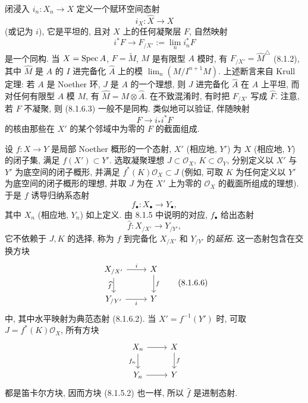 闭浸入 $i_n:X_n\to X$ 定义一个赋环空间态射
\begin{equation}i_X:\widehat X\longrightarrow X\tag{8.1.6.2}\label{ch08:eq8162}\end{equation}
(或记为 $i$), 它是平坦的, 且对 $X$ 上的任何凝聚层 $F$, 自然映射
\begin{equation}i^*F\longrightarrow F_{/X'}:=\lim_n i_n^*F\tag{8.1.6.3}\label{ch08:eq8163}\end{equation}
是一个同构. 当 $X=\operatorname{Spec} A$, $F=\widetilde M$, $M$ 是有限型 $A$ 模时, 有 $F_{/X'}=\widehat M^\triangle$ (8.1.2), 其中 $\widehat M$ 是 $A$ 的 $I$ 进完备化 $\widehat A$ 上的模 $\lim_n(M/I^{n+1}M)$. 上述断言来自 Krull 定理: 若 $A$ 是 Noether 环, $J$ 是 $A$ 的一个理想, 则 $J$ 进完备化 $\widehat A$ 在 $A$ 上平坦, 而对任何有限型 $A$ 模 $M$, 有 $\widehat M=M\otimes\widehat A$. 在不致混淆时, 有时把 $F_{/X'}$ 写成 $\widehat F$. 注意, 若 $F$ 不凝聚, 则 (8.1.6.3) 一般不是同构. 类似地可以验证, 伴随映射
\begin{equation}F\longrightarrow i_*i^*F\tag{8.1.6.4}\label{ch08:eq8164}\end{equation}
的核由那些在 $X'$ 的某个邻域中为零的 $F$ 的截面组成.

设 $f:X\to Y$ 是局部 Noether 概形的一个态射, $X'$ (相应地, $Y'$) 为 $X$ (相应地, $Y$) 的闭子集, 满足 $f(X')\subset Y'$. 选取凝聚理想 $J\subset\mathcal O_X$, $K\subset\mathcal O_Y$, 分别定义以 $X'$ 与 $Y'$ 为底空间的闭子概形, 并满足 $f^*(K)\mathcal O_X\subset J$ (例如, 可取 $K$ 为任何定义以 $Y'$ 为底空间的闭子概形的理想, 并取 $J$ 为在 $X'$ 上为零的 $\mathcal O_X$ 的截面所组成的理想). 于是 $f$ 诱导归纳系态射
\[f_\bullet:X_\bullet\longrightarrow Y_\bullet,\]
其中 $X_n$ (相应地, $Y_n$) 如上定义. 由 8.1.5 中说明的对应, $f_\bullet$ 给出态射
\begin{equation}\widehat f:X_{/X'}\longrightarrow Y_{/Y'},\tag{8.1.6.5}\label{ch08:eq8165}\end{equation}
它不依赖于 $J,K$ 的选择, 称为 $f$ 到完备化 $X_{/X'}$ 和 $Y_{/Y'}$ 的\emph{延拓}. 这一态射包含在交换方块
\begin{equation}
\begin{tikzcd}X_{/X'}\arrow[r,"i"]\arrow[d,"\widehat f"']&X\arrow[d,"f"]\\Y_{/Y'}\arrow[r,"i"']&Y\end{tikzcd}
\tag{8.1.6.6}\label{ch08:eq8166}\end{equation}
中, 其中水平映射为典范态射 (8.1.6.2). 当 $X'=f^{-1}(Y')$ 时, 可取 $J=f^*(K)\mathcal O_X$, 所有方块
\[\begin{tikzcd}X_n\arrow[r]\arrow[d,"f_n"']&X\arrow[d,"f"]\\Y_n\arrow[r]&Y\end{tikzcd}\]
都是笛卡尔方块, 因而方块 (8.1.5.2) 也一样, 所以 $\widehat f$ 是进制态射.

